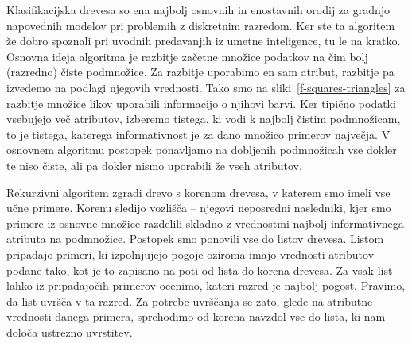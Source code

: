 Klasifikacijska drevesa so ena najbolj osnovnih in enostavnih orodij za gradnjo napovednih modelov pri problemih z diskretnim razredom. Ker ste ta algoritem že dobro spoznali pri uvodnih predavanjih iz umetne inteligence, tu le na kratko. Osnovna ideja algoritma je razbitje začetne množice podatkov na čim bolj (razredno) čiste podmnožice. Za razbitje uporabimo en sam atribut, razbitje pa izvedemo na podlagi njegovih vrednosti. Tako smo na sliki~\ref{f-squares-triangles} za razbitje množice likov uporabili informacijo o njihovi barvi. Ker tipično podatki vsebujejo več atributov, izberemo tistega, ki vodi k najbolj čistim podmnožicam, to je tistega, katerega informativnost je za dano množico primerov največja. V osnovnem algoritmu postopek ponavljamo na dobljenih podmnožicah vse dokler te niso čiste, ali pa dokler nismo uporabili že vseh atributov.

Rekurzivni algoritem zgradi drevo s korenom drevesa, v katerem smo imeli vse učne primere. Korenu sledijo vozlišča -- njegovi neposredni nasledniki, kjer smo primere iz osnovne množice razdelili skladno z vrednostmi najbolj informativnega atributa na podmnožice. Postopek smo ponovili vse do listov drevesa. Listom pripadajo primeri, ki izpolnjujejo pogoje oziroma imajo vrednosti atributov podane tako, kot je to zapisano na poti od lista do korena drevesa. Za vsak list lahko iz pripadajočih primerov ocenimo, kateri razred je najbolj pogost. Pravimo, da list uvršča v ta razred. Za potrebe uvrščanja se zato, glede na atributne vrednosti danega primera, sprehodimo od korena navzdol vse do lista, ki nam določa ustrezno uvrstitev.

